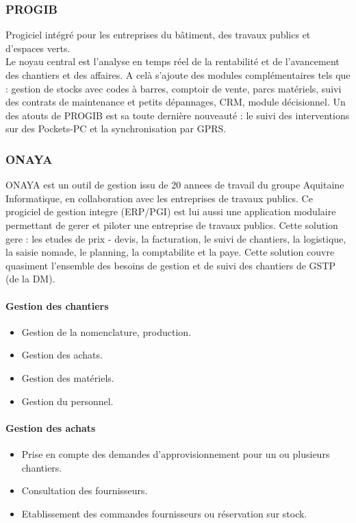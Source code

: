		\subsubsection{PROGIB}
				 
				Progiciel intégré pour les entreprises du bâtiment, des travaux publics et d'espaces verts.\\

Le noyau central est l'analyse en temps réel de la rentabilité et de l'avancement des chantiers et des affaires. A celà s'ajoute des modules complémentaires tels que
 : gestion de stocks avec codes à barres, comptoir de vente, parcs matériels, suivi des contrats de maintenance et petits dépannages, CRM, module décisionnel.
Un des atouts de PROGIB est sa toute dernière nouveauté : le suivi des interventions sur des Pockets-PC et la synchronisation par GPRS.

		\subsubsection{ONAYA}
		ONAYA est un outil de gestion issu de 20 annees de travail du groupe Aquitaine Informatique, en collaboration avec les entreprises de travaux publics. Ce progiciel de gestion integre (ERP/PGI) est lui aussi une application modulaire permettant de gerer et piloter une entreprise de travaux publics. Cette solution gere : les etudes de prix - devis, la facturation, le suivi de chantiers, la
logistique, la saisie nomade, le planning, la comptabilite et la paye. Cette solution couvre quasiment l'ensemble des besoins de gestion et de suivi des chantiers de GSTP (de la DM).

				\paragraph{Gestion des chantiers}
				\begin{itemize}
				    \item Gestion de la nomenclature, production.
				    \item Gestion des achats.
				    \item Gestion des matériels.
				    \item Gestion du personnel.
				\end{itemize}
				
				\paragraph{Gestion des achats}
				\begin{itemize}
				    \item Prise en compte des demandes d'approvisionnement pour un ou plusieurs chantiers.
				    \item Consultation des fournisseurs.
				    \item Etablissement des commandes fournisseurs ou réservation sur stock.
				\end{itemize}
				
